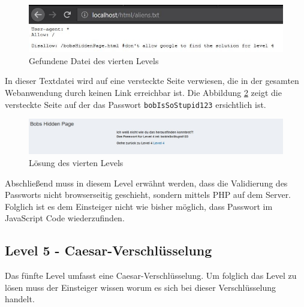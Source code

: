 \begin{figure}[H]
	\centering
	\includegraphics[width=\textwidth]{images/LoginParcours/login_level4_file.jpg}
	\caption{Gefundene Datei des vierten Levels}
	\label{fig:login-parcours-level4-hint}
\end{figure}

In dieser Textdatei wird auf eine versteckte Seite verwiesen, die in der gesamten Webanwendung durch keinen Link erreichbar ist. Die Abbildung \ref{fig:login-parcours-level4-solution} zeigt die versteckte Seite auf der das Passwort \colorbox{altgray}{\lstinline|bobIsSoStupid123|} ersichtlich ist. \\

\begin{figure}[H]
	\centering
	\includegraphics[width=\textwidth]{images/LoginParcours/login_level4_solution.jpg}
	\caption{Lösung des vierten Levels}
	\label{fig:login-parcours-level4-solution}
\end{figure} 

Abschließend muss in diesem Level erwähnt werden, dass die Validierung des Passworts nicht browserseitig geschieht, sondern mittels PHP auf dem Server. Folglich ist es dem Einsteiger nicht wie bisher möglich, dass Passwort im JavaScript Code wiederzufinden. 

\subsection{Level 5 - Caesar-Verschlüsselung}
Das fünfte Level umfasst eine Caesar-Verschlüsselung. Um folglich das Level zu lösen muss der Einsteiger wissen worum es sich bei dieser Verschlüsselung handelt. \\ 
